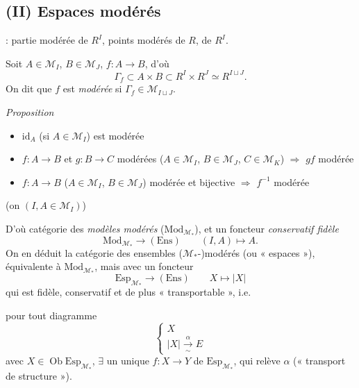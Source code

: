 \documentclass[11pt,a4paper]{article}
\begin{document}
\subsection*{(II) Espaces modérés}


 \ill{} : partie modérée de $R^I$, points modérés de $R$, de
$R^I$.

Soit $A \in \mathcal{M}_I$, $B \in \mathcal{M}_J$, $f : A \to B$, d'où
\[ \Gamma_f \subset A \times B \subset R^I \times R^J \simeq R^{I \sqcup J} .
\]
On dit que $f$ est \emph{modérée} si $\Gamma_f \in \mathcal{M}_{I \sqcup J}$.

\emph{Proposition}
\begin{itemize}
  \item[a)] $\mathrm{id}_A$ (si $A \in \mathcal{M}_I$) est modérée
  \item[b)] $f : A \to B$ et $g : B \to C$ modérées ($A \in \mathcal{M}_I$, $B
  \in \mathcal{M}_J$, $C \in \mathcal{M}_K$) $\Rightarrow$ $gf$ modérée
  \item[c)] $f : A \to B$ ($A \in \mathcal{M}_I$, $B \in \mathcal{M}_J$)
  modérée et bijective $\Rightarrow$ $f^{-1}$ modérée
\end{itemize}
(on  $(I, A \in \mathcal{M}_I)$)

D'où catégorie des \emph{modèles modérés} ($\mathrm{Mod}_{\mathcal{M}_*}$), et
un foncteur \emph{conservatif fidèle}
\[ \mathrm{Mod}_{\mathcal{M}_*} \longrightarrow (\mathrm{Ens}) \qquad (I, A)
\mapsto A . \]
On en déduit la catégorie des ensembles ($\mathcal{M}_*$-)modérés (ou
« espaces »), équivalente à $\mathrm{Mod}_{\mathcal{M}_*}$, mais avec un
foncteur
\[ \mathrm{Esp}_{\mathcal{M}_*} \longrightarrow (\mathrm{Ens}) \qquad X
\mapsto |X| \]
qui est fidèle, conservatif et de plus « transportable », i.e.

pour tout diagramme
\[ \begin{cases} X \\ |X| \xrightarrow[\sim]{\ \alpha\ } E \end{cases} \]
avec $X \in \operatorname{Ob} \mathrm{Esp}_{\mathcal{M}_*}$, $\exists$ un unique
  $f : X \to Y$ de
$\mathrm{Esp}_{\mathcal{M}_*}$, qui relève $\alpha$ (« transport de
structure »).
\end{document}
